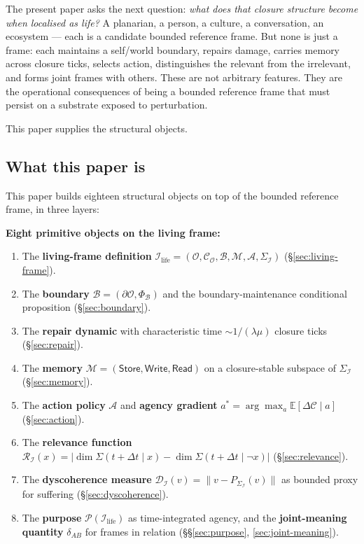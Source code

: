 \documentclass[11pt]{article}
\theoremstyle{plain}
\theoremstyle{definition}
\theoremstyle{remark}
\newcommand{\Ical}{\mathcal{I}}
\newcommand{\Ocal}{\mathcal{O}}
\newcommand{\Ccal}{\mathcal{C}}
\newcommand{\Mcal}{\mathcal{M}}
\newcommand{\Acal}{\mathcal{A}}
\newcommand{\Bcal}{\mathcal{B}}
\newcommand{\Rcal}{\mathcal{R}}
\newcommand{\Dcal}{\mathcal{D}}
\newcommand{\Pcal}{\mathcal{P}}
\newcommand{\Ilife}{\Ical_{\mathrm{life}}}
\begin{document}
The present paper asks the next question: \emph{what does that closure structure become when localised as life?} A planarian, a person, a culture, a conversation, an ecosystem --- each is a candidate bounded reference frame. But none is just a frame: each maintains a self/world boundary, repairs damage, carries memory across closure ticks, selects action, distinguishes the relevant from the irrelevant, and forms joint frames with others. These are not arbitrary features. They are the operational consequences of being a bounded reference frame that must persist on a substrate exposed to perturbation.

This paper supplies the structural objects.

\subsection{What this paper is}

This paper builds eighteen structural objects on top of the bounded reference frame, in three layers:

\textbf{Eight primitive objects on the living frame:}
\begin{enumerate}[leftmargin=2em]
\item The \textbf{living-frame definition} $\Ilife = (\Ocal, \Ccal_\Ocal, \Bcal, \Mcal, \Acal, \Sigma_\Ical)$ (\S\ref{sec:living-frame}).
\item The \textbf{boundary} $\Bcal = (\partial \Ocal, \Phi_\Bcal)$ and the boundary-maintenance conditional proposition (\S\ref{sec:boundary}).
\item The \textbf{repair dynamic} with characteristic time $\sim 1/(\lambda \mu)$ closure ticks (\S\ref{sec:repair}).
\item The \textbf{memory} $\Mcal = (\mathsf{Store}, \mathsf{Write}, \mathsf{Read})$ on a closure-stable subspace of $\Sigma_\Ical$ (\S\ref{sec:memory}).
\item The \textbf{action policy} $\Acal$ and \textbf{agency gradient} $a^* = \arg\max_a \mathbb{E}[\Delta\Ccal \mid a]$ (\S\ref{sec:action}).
\item The \textbf{relevance function} $\Rcal_\Ical(x) = |\dim\Sigma(t+\Delta t \mid x) - \dim\Sigma(t+\Delta t \mid \neg x)|$ (\S\ref{sec:relevance}).
\item The \textbf{dyscoherence measure} $\Dcal_\Ical(v) = \|v - P_{\Sigma_\Ical}(v)\|$ as bounded proxy for suffering (\S\ref{sec:dyscoherence}).
\item The \textbf{purpose} $\Pcal(\Ilife)$ as time-integrated agency, and the \textbf{joint-meaning quantity} $\delta_{AB}$ for frames in relation (\S\S\ref{sec:purpose}, \ref{sec:joint-meaning}).
\end{enumerate}
\end{document}
